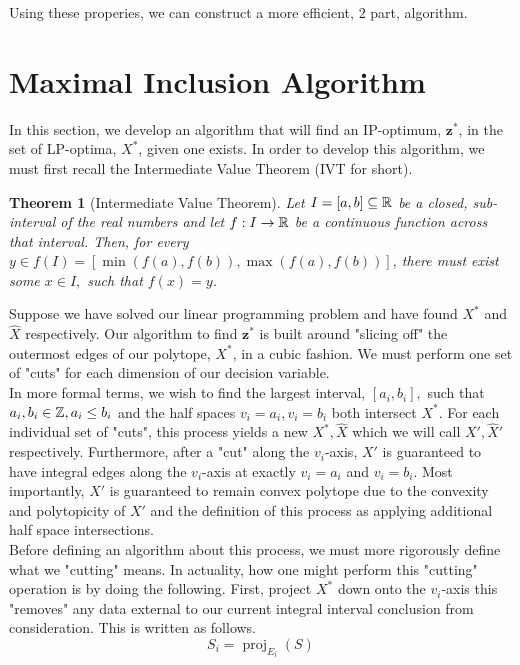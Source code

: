\documentclass[conference]{IEEEtran}
\numberwithin{equation}{section}
\numberwithin{figure}{section}
\theoremstyle{plain}
\newtheorem{thm}[equation]{Theorem}
\theoremstyle{definition}
\newcommand{\R}{\ensuremath \mathbb{R}}
\newcommand{\Z}{\ensuremath \mathbb{Z}}
\newcommand{\1}{\ensuremath \mathbbm{1}}
\DeclareMathOperator{\vproj}{proj}
\begin{document}
Using these properies, we can construct a more efficient, $2$ part, algorithm. \\

\section{Maximal Inclusion Algorithm}
In this section, we develop an algorithm that will find an IP-optimum, 
$\mathbf{z}^*$, in the set of LP-optima, $X^*$, given one exists. In order to 
develop this algorithm, we must first recall the Intermediate Value Theorem (IVT 
for short). \\
\begin{thm}[Intermediate Value Theorem]
Let $I = [a,b] \subseteq \R$ be a closed, sub-interval of the real numbers and 
let $f: I \to \R$ be a continuous function across that interval. Then, for every 
$y \in f(I) = [\min(f(a),f(b)),\max(f(a),f(b))]$, there must exist some $x \in 
I,$ such that $f(x) = y$. \\
\end{thm}
Suppose we have solved our linear programming problem and have found $X^*$ and 
$\hat{X}$ respectively. Our algorithm to find $\mathbf{z}^*$ is built around 
"slicing off" the outermost edges of our polytope, $X^*$, in a cubic fashion.
We must perform one set of "cuts" for each dimension of our decision variable. \\ \hfill \break
In more formal terms, we wish to find the largest interval, $[a_i,b_i],$ such 
that $a_i,b_i \in \Z, a_i \leq b_i$ and the half spaces $v_i = a_i, v_i = b_i$ 
both intersect $X^*$. For each individual set of "cuts", this process yields 
a new $X^*,\hat{X}$ which we will call $X',\hat{X}'$ respectively. Furthermore, 
after a "cut" along the $v_i$-axis, $X'$ is guaranteed to have integral edges 
along the $v_i$-axis at exactly $v_i=a_i$ and $v_i=b_i$. Most importantly, $X'$ 
is guaranteed to remain convex polytope due to the convexity and polytopicity 
of $X'$ and the definition of this process as applying additional half space 
intersections. \\ \hfill \break
Before defining an algorithm about this process, we must more rigorously define 
what we "cutting" means. In actuality, how one might perform this "cutting" 
operation is by doing the following. First, project $X^*$ down onto the 
$v_i$-axis this "removes" any data external to our current integral interval 
conclusion from consideration. This is written as follows. \\
\[S_i = \vproj_{E_i}(S)\] \\
\end{document}
